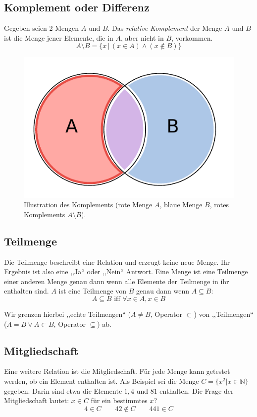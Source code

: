 \subsection{Komplement oder Differenz}
%
Gegeben seien 2 Mengen $A$ und $B$. Das \emph{relative Komplement} der Menge $A$ und $B$
ist die Menge jener Elemente, die in $A$, aber nicht in $B$, vorkommen.
\[
    A \setminus B = \{x \,|\, (x \in A) \land (x \notin B)\}
\]
%
\begin{figure}[p]
 \begin{center}
  \includegraphics{img/complement.pdf}
  \caption{Illustration des Komplements (rote Menge $A$, blaue Menge $B$,
        rotes Komplements $A \setminus B$).}
  \label{fig:complement}
 \end{center}
\end{figure}

\subsection{Teilmenge}
%
Die Teilmenge beschreibt eine Relation und erzeugt keine neue Menge.
Ihr Ergebnis ist also eine ,,Ja`` oder ,,Nein`` Antwort.
Eine Menge ist eine Teilmenge einer anderen Menge genau dann wenn alle
Elemente der Teilmenge in ihr enthalten sind. $A$ ist eine
Teilmenge von $B$ genau dann wenn $A \subseteq B$:
\[
    A \subseteq B \text{ iff } \forall x \in A, x \in B
\]

Wir grenzen hierbei ,,echte Teilmengen`` ($A \neq B $, Operator $\subset$)
von ,,Teilmengen`` ($A = B \lor A \subset B$, Operator $\subseteq$) ab.

\subsection{Mitgliedschaft}
%
Eine weitere Relation ist die Mitgliedschaft.
Für jede Menge kann getestet werden, ob ein Element enthalten ist. Als Beispiel
sei die Menge $C = \{x^2 | x \in \mathbb{N}\}$ gegeben. Darin sind etwa die Elemente
$1, 4$ und $81$ enthalten. Die Frage der Mitgliedschaft lautet: $x \in C$ für
ein bestimmtes $x$?
\[
  4 \in C  \qquad  42 \notin C  \qquad  441 \in C
\]

